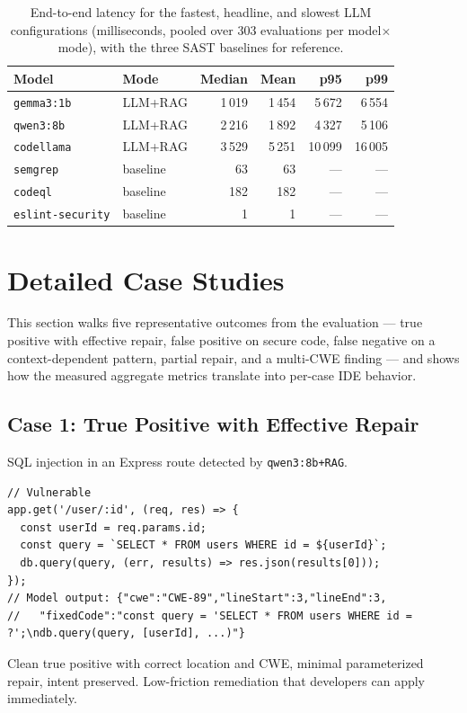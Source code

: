 \begin{table}[H]
\centering
\caption[End-to-end latency: fastest, headline, and slowest configurations.]{End-to-end latency for the fastest, headline, and slowest LLM configurations (milliseconds, pooled over 303 evaluations per model$\times$mode), with the three SAST baselines for reference.}
\label{tab:r4-latency-app}
\footnotesize
\begin{tabular}{@{}llrrrr@{}}
\toprule
\textbf{Model} & \textbf{Mode} & \textbf{Median} & \textbf{Mean} & \textbf{p95} & \textbf{p99} \\
\midrule
\texttt{gemma3:1b} & LLM+RAG  & 1\,019 & 1\,454 & 5\,672 & 6\,554 \\
\texttt{qwen3:8b}  & LLM+RAG  & 2\,216 & 1\,892 & 4\,327 & 5\,106 \\
\texttt{codellama} & LLM+RAG  & 3\,529 & 5\,251 & 10\,099 & 16\,005 \\
\midrule
\texttt{semgrep}         & baseline & 63 & 63 & --- & --- \\
\texttt{codeql}          & baseline & 182 & 182 & --- & --- \\
\texttt{eslint-security} & baseline & 1 & 1 & --- & --- \\
\bottomrule
\end{tabular}
\end{table}

\section{Detailed Case Studies}
\label{appendix:case-studies}

This section walks five representative outcomes from the evaluation --- true positive with effective repair, false positive on secure code, false negative on a context-dependent pattern, partial repair, and a multi-CWE finding --- and shows how the measured aggregate metrics translate into per-case IDE behavior.

\subsection{Case 1: True Positive with Effective Repair}
\label{sec:case-tp-good}
SQL injection in an Express route detected by \texttt{qwen3:8b+RAG}.
\begin{lstlisting}[caption={SQL injection vulnerability (CWE-89) and the model's repair}]
// Vulnerable
app.get('/user/:id', (req, res) => {
  const userId = req.params.id;
  const query = `SELECT * FROM users WHERE id = ${userId}`;
  db.query(query, (err, results) => res.json(results[0]));
});
// Model output: {"cwe":"CWE-89","lineStart":3,"lineEnd":3,
//   "fixedCode":"const query = 'SELECT * FROM users WHERE id = ?';\ndb.query(query, [userId], ...)"}
\end{lstlisting}
Clean true positive with correct location and CWE, minimal parameterized repair, intent preserved. Low-friction remediation that developers can apply immediately.

